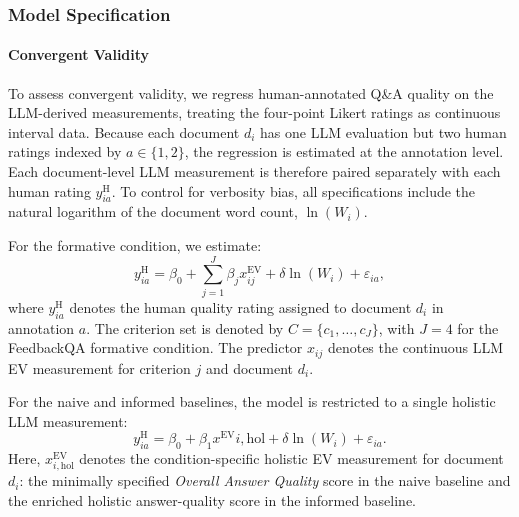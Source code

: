 

\subsubsection{Model Specification}

\paragraph{Convergent Validity}

To assess convergent validity, we regress human-annotated Q\&A quality on the LLM-derived measurements, treating the four-point Likert ratings as continuous interval data. Because each document $d_i$ has one LLM evaluation but two human ratings indexed by $a \in \{1,2\}$, the regression is estimated at the annotation level. Each document-level LLM measurement is therefore paired separately with each human rating $y^{\text{H}}_{ia}$. To control for verbosity bias, all specifications include the natural logarithm of the document word count, $\ln(W_i)$.

For the formative condition, we estimate:
\begin{equation}\label{eq:feedbackqa_formative_regression}
    y^{\text{H}}_{ia} = \beta_0 + \sum_{j=1}^{J} \beta_j x^{\text{EV}}_{ij} + \delta \ln(W_i) + \varepsilon_{ia},
\end{equation}
where $y^{\text{H}}_{ia}$ denotes the human quality rating assigned to document $d_i$ in annotation $a$. The criterion set is denoted by \(C=\{c_1,\ldots,c_J\}\), with \(J=4\) for the FeedbackQA formative condition. The predictor $x_{ij}$ denotes the continuous LLM EV measurement for criterion $j$ and document $d_i$.

For the naive and informed baselines, the model is restricted to a single holistic LLM measurement:
\begin{equation}\label{eq:feedbackqa_baseline_regression}
    y^{\text{H}}_{ia} = \beta_0 + \beta_1 x^{\text{EV}}{i,\mathrm{hol}} + \delta \ln(W_i) + \varepsilon_{ia}.
\end{equation}
Here, $x^{\text{EV}}_{i,\mathrm{hol}}$ denotes the condition-specific holistic EV measurement for document $d_i$: the minimally specified \textit{Overall Answer Quality} score in the naive baseline and the enriched holistic answer-quality score in the informed baseline.

